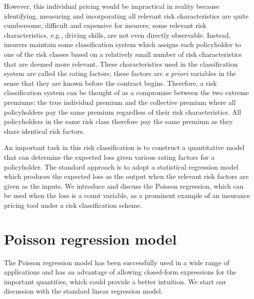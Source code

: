 \documentclass[12pt]{article}
\begin{document}
However, this individual pricing would be impractical in reality because identifying, measuring and incorporating all relevant risk characteristics are quite cumbersome, difficult and expensive for insurers; some relevant risk characteristics, e.g., driving skills, are not even directly observable. Instead, insurers maintain some classification system which assigns each policyholder to one of the risk classes based on a relatively small number of risk characteristics that are deemed more relevant. These characteristics used in the classification system are called the rating factors; these factors are \textit{a priori} variables in the sense that they are known before the contract begins. Therefore, a risk classification system can be thought of as a compromise between the two extreme premiums: the true individual premium and the collective premium where all policyholders pay the same premium regardless of their risk characteristics. All policyholders in the same risk class therefore pay the same premium as they share identical risk factors.

An important task in this risk classification is to construct a quantitative model that can determine the expected loss given various rating factors for a policyholder. The standard approach is to adopt a statistical regression model which produces the expected loss as the output when the relevant risk factors are given as the inputs. We introduce and discuss the Poisson regression, which can be used when the loss is a count variable, as a prominent example of an insurance pricing tool under a risk classification scheme.

\section{Poisson regression model}
The Poisson regression model has been successfully used in a wide range of applications and has an advantage of allowing closed-form expressions for the important quantities, which could provide a better intuition. We start our discussion with the standard linear regression model.
\end{document}
